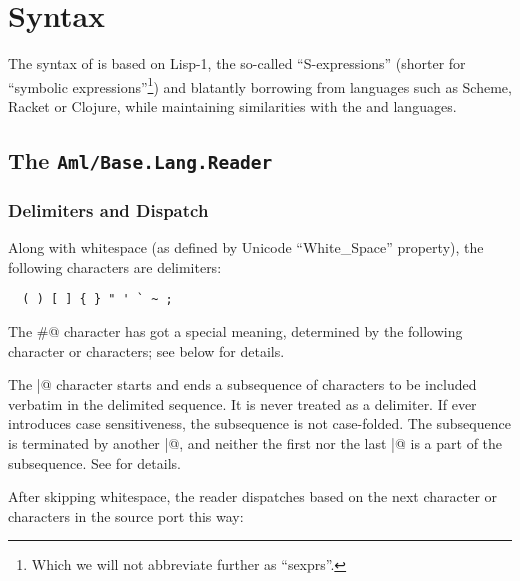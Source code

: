
\chapter{Syntax}
\label{ch:aml-base-syntax}

The syntax of \AmlBase is based on Lisp-1, the so-called ``S-expressions'' (shorter for ``symbolic expressions''\footnote{Which we will not abbreviate further as ``sexprs''.}) and blatantly borrowing from languages such as Scheme, Racket or Clojure, while maintaining similarities with the \Aml and \AmlCore languages. 




\section[The Aml/Base.Lang.Reader]{The \lstinline!Aml/Base.Lang.Reader!}
\label{sec:aml-base-lang-reader}




\subsection{Delimiters and Dispatch}
\label{subsec:aml-base-lang-reader-delimiters-dispatch}

Along with whitespace (as defined by Unicode ``White\_Space'' property), the following characters are delimiters:

\begin{lstlisting}
  ( ) [ ] { } " ' ` ~ ;
\end{lstlisting}

The \lstinline@#@ character has got a special meaning, determined by the following character or characters; see below for details.

The \lstinline@|@ character starts and ends a subsequence of characters to be included verbatim in the delimited sequence. It is never treated as a delimiter. If \AmlBase ever introduces case sensitiveness, the subsequence is not case-folded. The subsequence is terminated by another \lstinline@|@, and neither the first nor the last \lstinline@|@ is a part of the subsequence. See  for details.

After skipping whitespace, the \AmlBase reader dispatches based on the next character or characters in the source port this way:

